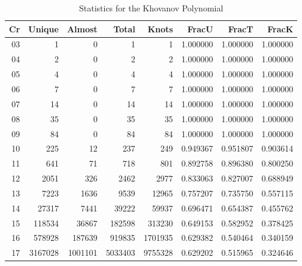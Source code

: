 \documentclass{article}
\theoremstyle{plain}
\begin{document}
        \begin{table}
            \centering
            \begin{tabular}{| r | r | r | r | r | r | r | r |}
                \hline
                Cr & Unique  & Almost  &  Total  &  Knots  &  FracU   &  FracT   &  FracK\\
                \hline
                03 &       1 &       0 &       1 &       1 & 1.000000 & 1.000000 & 1.000000\\
                04 &       2 &       0 &       2 &       2 & 1.000000 & 1.000000 & 1.000000\\
                05 &       4 &       0 &       4 &       4 & 1.000000 & 1.000000 & 1.000000\\
                06 &       7 &       0 &       7 &       7 & 1.000000 & 1.000000 & 1.000000\\
                07 &      14 &       0 &      14 &      14 & 1.000000 & 1.000000 & 1.000000\\
                08 &      35 &       0 &      35 &      35 & 1.000000 & 1.000000 & 1.000000\\
                09 &      84 &       0 &      84 &      84 & 1.000000 & 1.000000 & 1.000000\\
                10 &     225 &      12 &     237 &     249 & 0.949367 & 0.951807 & 0.903614\\
                11 &     641 &      71 &     718 &     801 & 0.892758 & 0.896380 & 0.800250\\
                12 &    2051 &     326 &    2462 &    2977 & 0.833063 & 0.827007 & 0.688949\\
                13 &    7223 &    1636 &    9539 &   12965 & 0.757207 & 0.735750 & 0.557115\\
                14 &   27317 &    7441 &   39222 &   59937 & 0.696471 & 0.654387 & 0.455762\\
                15 &  118534 &   36867 &  182598 &  313230 & 0.649153 & 0.582952 & 0.378425\\
                16 &  578928 &  187639 &  919835 & 1701935 & 0.629382 & 0.540464 & 0.340159\\
                17 & 3167028 & 1001101 & 5033403 & 9755328 & 0.629202 & 0.515965 & 0.324646\\
                \hline
            \end{tabular}
            \caption{Statistics for the Khovanov Polynomial}
            \label{tab:kho_stat}
        \end{table}
\end{document}
